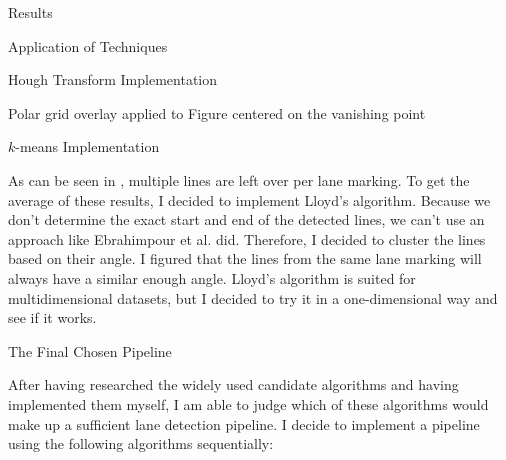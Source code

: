 \documentclass{matthijs}
\begin{document}
\begin{hoofdstuk}{Results}
\begin{paragraaf}{Application of Techniques}
\begin{subparagraaf}{Hough Transform Implementation}
\begin{figuur}{Polar grid overlay applied to Figure  centered on the vanishing point}

				\end{figuur}

			\end{subparagraaf}

			\begin{subparagraaf}{$k$-means Implementation}

				As can be seen in , multiple lines are left over per lane marking.
				To get the average of these results, I decided to implement Lloyd's algorithm.
				Because we don't determine the exact start and end of the detected lines, we can't use an approach like Ebrahimpour et al. \cite{ebrahimpour2012vanishing} did.
				Therefore, I decided to cluster the lines based on their angle.
				I figured that the lines from the same lane marking will always have a similar enough angle.
				Lloyd's algorithm is suited for multidimensional datasets, but I decided to try it in a one-dimensional way and see if it works.

			\end{subparagraaf}

		\end{paragraaf}

		\begin{paragraaf}{The Final Chosen Pipeline}

			After having researched the widely used candidate algorithms and having implemented them myself, I am able to judge which of these algorithms would make up a sufficient lane detection pipeline.
			I decide to implement a pipeline using the following algorithms sequentially:


\end{paragraaf}
\end{hoofdstuk}
\end{document}
